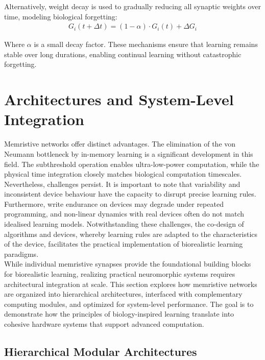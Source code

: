 \noindent Alternatively, weight decay is used to gradually reducing all synaptic weights over time, modeling biological forgetting:
\begin{align}
    G_i(t + \Delta t) = (1 - \alpha) \cdot G_i(t) + \Delta G_i \label{eq:2.39}
\end{align}

\noindent Where $\alpha$ is a small decay factor. These mechanisms ensure that learning remains stable over long durations, enabling continual learning without catastrophic forgetting.

\section[Architectures and System-Level Integration]{Architectures and System-Level Integration}

\noindent Memristive networks offer distinct advantages. The elimination of the von Neumann bottleneck by in-memory learning is a significant development in this field. The subthreshold operation enables ultra-low-power computation, while the physical time integration closely matches biological computation timescales. \\

\noindent Nevertheless, challenges persist. It is important to note that variability and inconsistent device behaviour have the capacity to disrupt precise learning rules. Furthermore, write endurance on devices may degrade under repeated programming, and non-linear dynamics with real devices often do not match idealised learning models. Notwithstanding these challenges, the co-design of algorithms and devices, whereby learning rules are adapted to the characteristics of the device, facilitates the practical implementation of biorealistic learning paradigms.\\

\noindent While individual memristive synapses provide the foundational building blocks for biorealistic learning, realizing practical neuromorphic systems requires architectural integration at scale. This section explores how memristive networks are organized into hierarchical architectures, interfaced with complementary computing modules, and optimized for system-level performance. The goal is to demonstrate how the principles of biology-inspired learning translate into cohesive hardware systems that support advanced computation.

\subsection[Hierarchical Modular Architectures]{Hierarchical Modular Architectures}


